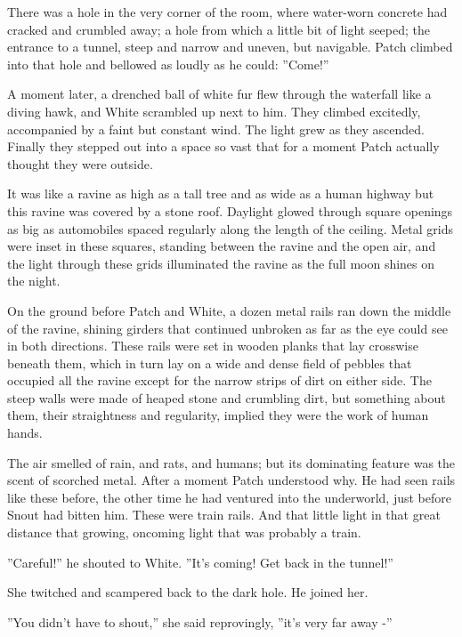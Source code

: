 \documentclass[12pt]{book}
\begin{document}
There was a hole in the very corner of the room, where water-worn concrete had cracked and crumbled away; a hole from which a little bit of light seeped; the entrance to a tunnel, steep and narrow and uneven, but navigable. Patch climbed into that hole and bellowed as loudly as he could: ''Come!''\par
 A moment later, a drenched ball of white fur flew through the waterfall like a diving hawk, and White scrambled up next to him. They climbed excitedly, accompanied by a faint but constant wind. The light grew as they ascended. Finally they stepped out into a space so vast that for a moment Patch actually thought they were outside.\par
 It was like a ravine as high as a tall tree and as wide as a human highway %
 but this ravine was covered by a stone roof. Daylight glowed through square openings as big as automobiles spaced regularly along the length of the ceiling. Metal grids were inset in these squares, standing between the ravine and the open air, and the light through these grids illuminated the ravine as the full moon shines on the night.\par
 On the ground before Patch and White, a dozen metal rails ran down the middle of the ravine, shining girders that continued unbroken as far as the eye could see in both directions. These rails were set in wooden planks that lay crosswise beneath them, which in turn lay on a wide and dense field of pebbles that occupied all the ravine except for the narrow strips of dirt on either side. The steep walls were made of heaped stone and crumbling dirt, but something about them, their straightness and regularity, implied they were the work of human hands.\par
 The air smelled of rain, and rats, and humans; but its dominating feature was the scent of scorched metal. After a moment Patch understood why. He had seen rails like these before, the other time he had ventured into the underworld, just before Snout had bitten him. These were train rails. And that little light in that great distance %
 that growing, oncoming light %
 that was probably a train.\par
 ''Careful!'' he shouted to White. ''It's coming! Get back in the tunnel!''\par
 She twitched and scampered back to the dark hole. He joined her.\par
 ''You didn't have to shout,'' she said reprovingly, ''it's very far away -''\par
\end{document}

